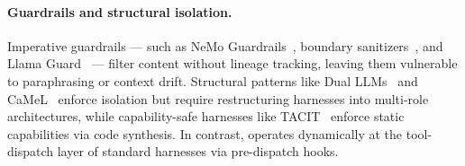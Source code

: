 \paragraph{Guardrails and structural isolation.}
Imperative guardrails — such as NeMo Guardrails~\cite{nvidia2023nemoguardrails}, boundary sanitizers~\cite{bhagwatkarIndirectPromptInjections2025}, and Llama Guard~\cite{inan2023llama} — filter content without lineage tracking, leaving them vulnerable to paraphrasing or context drift. Structural patterns like Dual LLMs~\cite{willison2023dual} and CaMeL~\cite{camel2025} enforce isolation but require restructuring harnesses into multi-role architectures, while capability-safe harnesses like TACIT~\cite{odersky2026tracking} enforce static capabilities via code synthesis. In contrast, \appa{} operates dynamically at the tool-dispatch layer of standard harnesses via pre-dispatch hooks.
